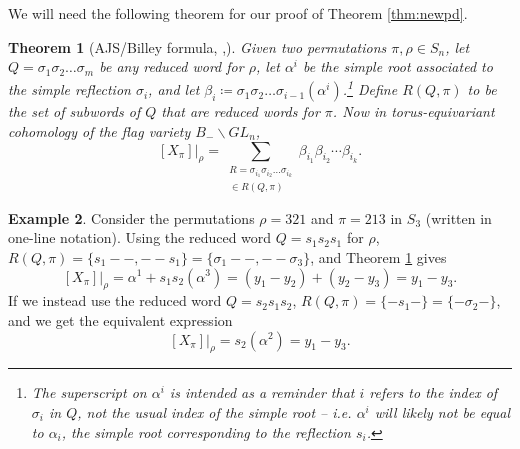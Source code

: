 \documentclass[reqno]{amsart}
\numberwithin{equation}{section}
\newtheorem{theorem}{Theorem}[section]
\theoremstyle{definition}
\newtheorem{example}[theorem]{Example}
\theoremstyle{remark}
\begin{document}
We will need the following theorem for our proof of Theorem \ref{thm:newpd}.
\begin{theorem}[AJS/Billey formula, \cite{AJS},\cite{Billey}]\label{thm:ajs-b}
Given two permutations $\pi,\rho \in S_n$, let $Q=\sigma_1\sigma_2\dots \sigma_m$ be any reduced word for $\rho$, let $\alpha^i$ be the simple root associated to the simple reflection $\sigma_i$, and let $\beta_i \coloneqq \sigma_1\sigma_2\dots \sigma_{i-1}(\alpha^i)$.\footnote{The superscript on $\alpha^i$ is intended as a reminder that $i$ refers to the index of $\sigma_i$ in $Q$, not the usual index of the simple root -- i.e. $\alpha^i$ will likely not be equal to $\alpha_i$, the simple root corresponding to the reflection $s_i$.} Define
$R(Q,\pi)$ to be the set of subwords of $Q$ that are reduced words for $\pi$. Now in torus-equivariant cohomology of the flag variety $B_- \backslash GL_n$,
\[[X_\pi]\Big|_{\rho}=\sum_{\substack{R=\sigma_{i_1}\sigma_{i_2}\dots \sigma_{i_k}\\ \in R(Q,\pi)}} \beta_{i_1}\beta_{i_2}\cdots\beta_{i_k}.\]
\end{theorem}
\begin{example}
Consider the permutations $\rho=321$ and $\pi=213$ in $S_3$ (written in one-line notation). Using the reduced word $Q=s_1s_2s_1$ for $\rho$, $R(Q,\pi)=\{s_1--,--s_1\}=\{\sigma_1--,--\sigma_3\}$, and Theorem \ref{thm:ajs-b} gives
\[[X_\pi]\Big|_{\rho}=\alpha^1+s_1s_2(\alpha^3)=(y_1-y_2)+(y_2-y_3)=y_1-y_3.\]
If we instead use the reduced word $Q=s_2s_1s_2$, $R(Q,\pi)=\{-s_1-\}=\{-\sigma_2-\}$, and we get the equivalent expression
\[[X_\pi]\Big|_{\rho}=s_2(\alpha^2)=y_1-y_3.\]
\end{example}
\end{document}
